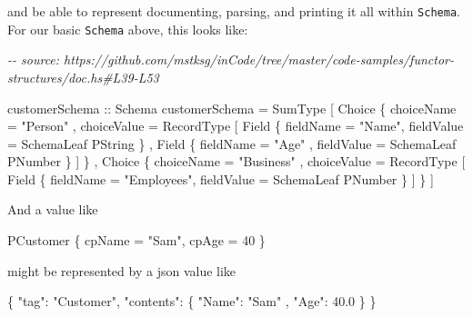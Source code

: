 \documentclass[]{article}
\newenvironment{Shaded}{}{}
\newcommand{\CommentTok}[1]{\textcolor[rgb]{0.38,0.63,0.69}{\textit{#1}}}
\newcommand{\DataTypeTok}[1]{\textcolor[rgb]{0.56,0.13,0.00}{#1}}
\newcommand{\DecValTok}[1]{\textcolor[rgb]{0.25,0.63,0.44}{#1}}
\newcommand{\FloatTok}[1]{\textcolor[rgb]{0.25,0.63,0.44}{#1}}
\newcommand{\FunctionTok}[1]{\textcolor[rgb]{0.02,0.16,0.49}{#1}}
\newcommand{\NormalTok}[1]{#1}
\newcommand{\OtherTok}[1]{\textcolor[rgb]{0.00,0.44,0.13}{#1}}
\newcommand{\StringTok}[1]{\textcolor[rgb]{0.25,0.44,0.63}{#1}}
\begin{document}
and be able to represent documenting, parsing, and printing it all within
\texttt{Schema}. For our basic \texttt{Schema} above, this looks like:

\begin{Shaded}
\begin{Highlighting}[]
\CommentTok{{-}{-} source: https://github.com/mstksg/inCode/tree/master/code{-}samples/functor{-}structures/doc.hs\#L39{-}L53}

\OtherTok{customerSchema ::} \DataTypeTok{Schema}
\NormalTok{customerSchema }\OtherTok{=} \DataTypeTok{SumType}
\NormalTok{    [ }\DataTypeTok{Choice}
\NormalTok{        \{ choiceName  }\OtherTok{=} \StringTok{"Person"}
\NormalTok{        , choiceValue }\OtherTok{=} \DataTypeTok{RecordType}
\NormalTok{            [ }\DataTypeTok{Field}\NormalTok{ \{ fieldName }\OtherTok{=} \StringTok{"Name"}\NormalTok{, fieldValue }\OtherTok{=} \DataTypeTok{SchemaLeaf} \DataTypeTok{PString}\NormalTok{ \}}
\NormalTok{            , }\DataTypeTok{Field}\NormalTok{ \{ fieldName }\OtherTok{=} \StringTok{"Age"}\NormalTok{ , fieldValue }\OtherTok{=} \DataTypeTok{SchemaLeaf} \DataTypeTok{PNumber}\NormalTok{ \}}
\NormalTok{            ]}
\NormalTok{        \}}
\NormalTok{    , }\DataTypeTok{Choice}
\NormalTok{        \{ choiceName  }\OtherTok{=} \StringTok{"Business"}
\NormalTok{        , choiceValue }\OtherTok{=} \DataTypeTok{RecordType}
\NormalTok{            [ }\DataTypeTok{Field}\NormalTok{ \{ fieldName }\OtherTok{=} \StringTok{"Employees"}\NormalTok{, fieldValue }\OtherTok{=} \DataTypeTok{SchemaLeaf} \DataTypeTok{PNumber}\NormalTok{ \} ]}
\NormalTok{        \}}
\NormalTok{    ]}
\end{Highlighting}
\end{Shaded}

And a value like

\begin{Shaded}
\begin{Highlighting}[]
\DataTypeTok{PCustomer}\NormalTok{ \{ cpName }\OtherTok{=} \StringTok{"Sam"}\NormalTok{, cpAge }\OtherTok{=} \DecValTok{40}\NormalTok{ \}}
\end{Highlighting}
\end{Shaded}

might be represented by a json value like

\begin{Shaded}
\begin{Highlighting}[]
\FunctionTok{\{} \DataTypeTok{"tag"}\FunctionTok{:} \StringTok{"Customer"}\FunctionTok{,} 
  \DataTypeTok{"contents"}\FunctionTok{:}
    \FunctionTok{\{} \DataTypeTok{"Name"}\FunctionTok{:} \StringTok{"Sam"}
    \FunctionTok{,} \DataTypeTok{"Age"}\FunctionTok{:} \FloatTok{40.0}
    \FunctionTok{\}}
\FunctionTok{\}}
\end{Highlighting}
\end{Shaded}
\end{document}
